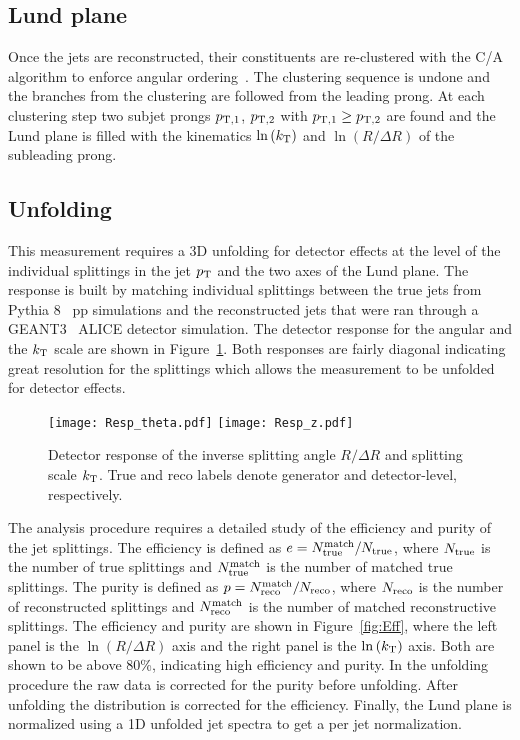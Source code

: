 \documentclass{PoS}
\begin{document}
\subsection{Lund plane}
Once the jets are reconstructed, their constituents are re-clustered with the C/A algorithm to enforce angular ordering~\cite{FastJetCA}. The clustering sequence is undone and the branches from the clustering are followed from the leading prong. At each clustering step  two subjet prongs $p_{\rm{T},1}$, $p_{\rm{T},2}$ with $p_{\rm{T},1} \geq p_{\rm{T},2}$ are found and the Lund plane is filled with the kinematics $\ln{(k_{\rm{T}})}$ and $\ln{(R/\Delta{R})}$ of the subleading prong. %

\subsection{Unfolding}
This measurement requires a 3D unfolding for detector effects at the level of the individual splittings in the jet $p_{\rm T}$ and the two axes of the Lund plane. The response is built by matching individual splittings between the true jets from Pythia 8~\cite{Sjostrand:2007gs} pp simulations and the reconstructed jets that were ran through a GEANT3~\cite{GEANT3} ALICE detector simulation. The detector response for the angular and the $k_{\rm T}$ scale are shown in Figure~\ref{fig:Resp}. Both responses are fairly diagonal indicating great resolution for the splittings which allows the measurement to be unfolded for detector effects.

\begin{figure}[ht!]
    \centering
    \texttt{[image: Resp\_theta.pdf]}
    \texttt{[image: Resp\_z.pdf]} 
    \caption{Detector response of the inverse splitting angle $R/\Delta{R}$ and splitting scale $k_{\rm T}$. True and reco labels denote generator and detector-level, respectively.}
    \label{fig:Resp}
\end{figure}

The analysis procedure requires a detailed study of the efficiency and purity of the jet splittings. The efficiency is defined as $e=N_{\rm true}^{\rm match}/N_{\rm true}$, where $N_{\rm true}$ is the number of true splittings and $N_{\rm true}^{\rm match}$ is the number of matched true splittings. The purity is defined as $p=N_{\rm reco}^{\rm match}/N_{\rm reco}$, where $N_{\rm reco}$ is the number of reconstructed splittings and $N_{\rm reco}^{\rm match}$ is the number of matched reconstructive splittings. The efficiency and purity are shown in Figure~\ref{fig:Eff}, where the left panel is the $\ln{(R/\Delta{R})}$ axis and the right panel is the $\ln{(k_{\rm{T}})}$ axis. Both are shown to be above 80\%, indicating high efficiency and purity. In the unfolding procedure the raw data is corrected for the purity before unfolding. After unfolding the distribution is corrected for the efficiency. Finally, the Lund plane is normalized using a 1D unfolded jet spectra to get a per jet normalization. 
\end{document}
